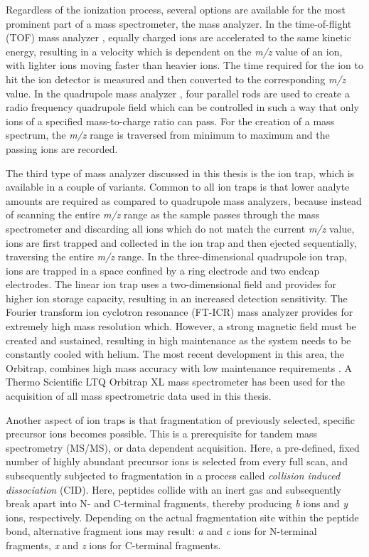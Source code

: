 Regardless of the ionization process, several options are available for
the most prominent part of a mass spectrometer, the mass analyzer.
In the time-of-flight (TOF) mass analyzer \citep{Wolff1953}, equally charged 
ions are accelerated to the same kinetic energy, resulting in a velocity 
which is dependent on the {\em m/z} value of an ion, with lighter ions
moving faster than heavier ions.
The time required for the ion to hit the ion detector is measured and
then converted to the corresponding {\em m/z} value.
In the quadrupole mass analyzer \citep{Paul1956}, four parallel rods are 
used to create a radio frequency quadrupole field which can be controlled
in such a way that only ions of a specified mass-to-charge ratio can pass.
For the creation of a mass spectrum, the {\em m/z} range is traversed from
minimum to maximum and the passing ions are recorded.


The third type of mass analyzer discussed in this thesis is the ion trap,
which is available in a couple of variants.
Common to all ion traps is that lower analyte amounts are required as
compared to quadrupole mass analyzers, because instead of scanning
the entire {\em m/z} range as the sample passes through the mass spectrometer 
and discarding all ions which do not match the current {\em m/z} value, 
ions are first trapped and collected in the ion trap and then ejected 
sequentially, traversing the entire {\em m/z} range.
In the three-dimensional quadrupole ion trap, ions are trapped in a space
confined by a ring electrode and two endcap electrodes.
The linear ion trap uses a two-dimensional field and provides for higher ion
storage capacity, resulting in an increased detection sensitivity.
The Fourier transform ion cyclotron resonance (FT-ICR) mass analyzer provides
for extremely high mass resolution which.
However, a strong magnetic field must be created and sustained, resulting
in high maintenance as the system needs to be constantly cooled with helium. 
The most recent development in this area, the Orbitrap, combines high mass 
accuracy with low maintenance requirements \citep{Hu2005}. 
A Thermo Scientific LTQ Orbitrap XL mass spectrometer has been used for the
acquisition of all mass spectrometric data used in this thesis.

Another aspect of ion traps is that fragmentation of previously selected,
specific precursor ions becomes possible.
This is a prerequisite for tandem mass spectrometry (MS/MS), or data dependent
acquisition.
Here, a pre-defined, fixed number of highly abundant precursor ions is selected
from every full scan, and subsequently subjected to fragmentation
in a process called {\em collision induced dissociation} (CID).
Here, peptides collide with an inert gas and subsequently break apart into 
N- and C-terminal fragments, thereby producing {\em b} ions and {\em y} ions, 
respectively. 
Depending on the actual fragmentation site within the peptide bond,
alternative fragment ions may result: {\em a} and {\em c} ions for N-terminal
fragments, {\em x} and {\em z} ions for C-terminal fragments.

